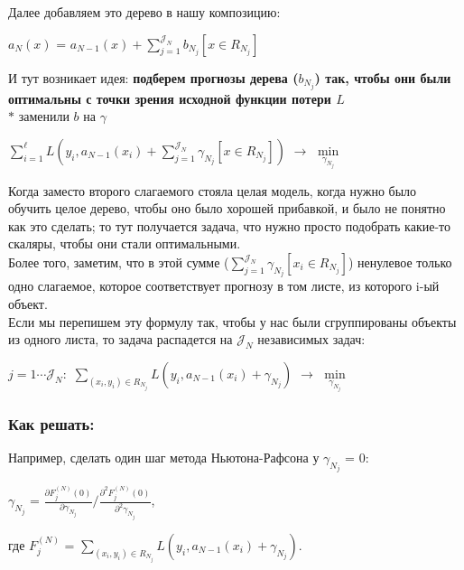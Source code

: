         Далее добавляем это дерево в нашу композицию:
        \begin{center}
            $a_N(x)$ = $a_{N-1}(x) + \sum\limits_{j = 1}^{\mathcal{J}_N }b_{N_j}[x \in R_{N_j}]$
        \end{center}

        И тут возникает идея: \textbf{подберем прогнозы дерева ($b_{N_j}$) так, чтобы они были оптимальны с точки зрения исходной функции потери $L$}\\
        $\ast$ заменили $b$ на $\gamma$
        \begin{center}
        \large
            $\sum\limits_{i = 1}^\ell L(y_i, a_{N - 1}(x_i) + \sum\limits_{j = 1}^{\mathcal{J}_N }\gamma_{N_j}[x \in R_{N_j}])$ $\longrightarrow$ $\min\limits_{\gamma_{N_j}}$
        \end{center}

        Когда заместо второго слагаемого стояла целая модель, когда нужно было обучить целое дерево, чтобы оно было хорошей прибавкой, и было не понятно как это сделать; то тут получается задача, что нужно просто подобрать какие-то скаляры, чтобы они стали оптимальными.\\

        Более того, заметим, что в этой сумме ($\sum\limits_{j = 1}^{\mathcal{J}_N }\gamma_{N_j}[x_i \in R_{N_j}]$) ненулевое только одно слагаемое, которое соответствует прогнозу в том листе, из которого i-ый объект.\\

        Если мы перепишем эту формулу так, чтобы у нас были сгруппированы объекты из одного листа, то задача распадется на $\mathcal{J}_N$ независимых задач:
        \begin{center}
        \Large
            $j = 1 \cdots \mathcal{J}_N:$ \quad\quad $\sum\limits_{(x_i, y_i) \in R_{N_j}}L(y_i, a_{N - 1}(x_i) + \gamma_{N_j})$ $\longrightarrow$ $\min\limits_{\gamma_{N_j}}$
        \end{center}

        \subsubsection{Как решать:}

            Например, сделать один шаг метода Ньютона-Рафсона у $\gamma_{N_j}$ = $0$:
            
            \begin{center}
            \large
                $\gamma_{N_j}$ = $\frac{\partial F^{(N)}_j(0)}{\partial \gamma_{N_j}} / \frac{\partial^2 F^{(N)}_j(0)}{\partial^2 \gamma_{N_j}}$,
            \end{center}
            где $F^{(N)}_j$ = $\sum\limits_{(x_i, y_i) \in R_{N_j}}L(y_i, a_{N - 1}(x_i) + \gamma_{N_j})$.\\

